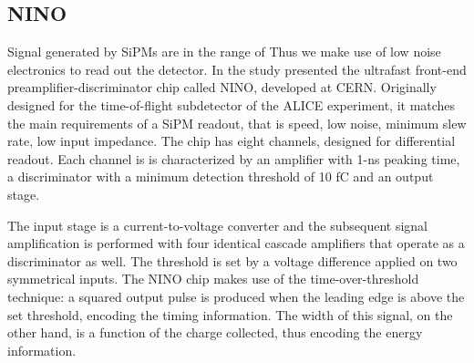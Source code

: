 \subsection{NINO}
Signal generated by SiPMs are in the range of  
Thus we make use of low noise electronics to read out the detector. In the study presented the ultrafast front-end preamplifier-discriminator chip called NINO, developed at CERN\cite{Anghinolfi2004}. Originally designed for the time-of-flight subdetector of the ALICE experiment, it matches the main requirements of a SiPM readout, that is speed, low noise, minimum slew rate, low input impedance.
The chip has eight channels, designed for differential readout. Each channel is is characterized by an amplifier with 1-ns peaking time, a discriminator with a minimum detection threshold of 10 fC and an output stage.


The input stage is a current-to-voltage converter and the subsequent signal amplification is performed with four identical cascade amplifiers that operate as a discriminator as well.
The threshold is set by a voltage difference applied on two symmetrical inputs.
The NINO chip makes use of the time-over-threshold technique: a squared output pulse is produced when the leading edge is above the set threshold, encoding the timing information. The width of this signal, on the other hand, is a function of the charge collected, thus encoding the energy information. 


